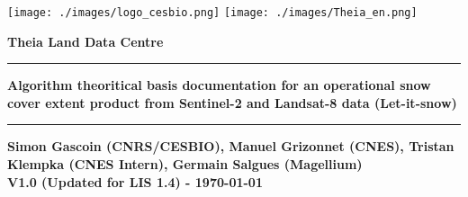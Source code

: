 \begin{titlepage}
\texttt{[image: ./images/logo\_cesbio.png]}
\hspace{5cm}
\texttt{[image: ./images/Theia\_en.png]}

\vspace{3cm}



\textcolor{PineGreen}{ \huge \bfseries Theia Land Data Centre\\ }
\rule{\linewidth}{0.5mm}
\begin{center}
{ \huge \bfseries Algorithm theoritical basis documentation for an operational snow cover extent product from Sentinel-2 and Landsat-8 data (Let-it-snow)\\}
\rule{\linewidth}{0.5mm}
{ \large \bfseries Simon Gascoin (CNRS/CESBIO), Manuel Grizonnet (CNES), Tristan
  Klempka (CNES Intern), Germain Salgues (Magellium) \\ }
{ \large \bfseries V1.0 (Updated for LIS 1.4) - \today \\ }



\end{center}
\end{titlepage}

